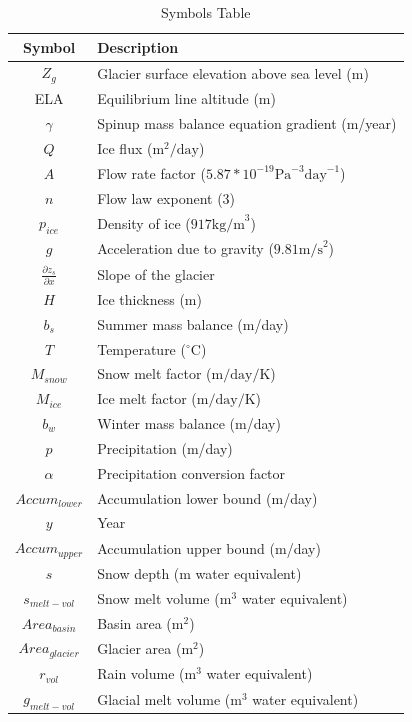 \documentclass{article}
\begin{document}
\begin{table}[h!]
    \centering
    \begin{tabularx}{\textwidth}{|c|X|}
        \hline
        Symbol & Description \\
        \hline
        $Z_g$ & Glacier surface elevation above sea level (m) \\
        ELA & Equilibrium line altitude (m)\\
        $\gamma$ & Spinup mass balance equation gradient (m/year)\\
        $Q$ & Ice flux ($\text{m}^2/\text{day}$)\\
        $A$ & Flow rate factor ($5.87*10^{-19}\text{Pa}^{-3}\text{day}^{-1}$) \\
        $n$ & Flow law exponent (3) \\
        $p_{ice}$ & Density of ice ($917\text{kg/m}^3$) \\
        $g$ & Acceleration due to gravity ($9.81\text{m/s}^2$) \\
        $\frac{\partial z_s}{\partial x}$ & Slope of the glacier \\
        $H$ & Ice thickness (m)\\
        $b_s$ & Summer mass balance (m/day) \\
        $T$ & Temperature ($^\circ$C) \\$M_{snow}$ & Snow melt factor ($\text{m}/\text{day}/\text{K}$) \\
        $M_{ice}$ & Ice melt factor ($\text{m}/\text{day}/\text{K}$) \\
        $b_w$ & Winter mass balance (m/day) \\
        $p$ & Precipitation (m/day) \\
        $\alpha$ & Precipitation conversion factor \\
        ${Accum}_{lower}$ & Accumulation lower bound (m/day) \\
        $y$ & Year \\
        ${Accum}_{upper}$ & Accumulation upper bound (m/day) \\
        $s$ & Snow depth (m water equivalent) \\
        $s_{melt-vol}$ & Snow melt volume ($\text{m}^3$ water equivalent) \\
        ${Area}_{basin}$ & Basin area ($\text{m}^2$) \\
        ${Area}_{glacier} $ & Glacier area ($\text{m}^2$) \\
        $r_{vol}$ & Rain volume ($\text{m}^3$ water equivalent) \\
        $g_{melt-vol}$ & Glacial melt volume ($\text{m}^3$ water equivalent) \\
        \hline
    \end{tabularx}
    \caption{Symbols Table}
    \label{tab:symbols_table}
\end{table}
\FloatBarrier
\end{document}
